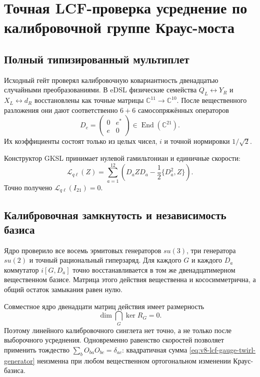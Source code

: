 \chapter{Точная LCF-проверка усреднение по калибровочной группе Краус-моста}
\label{ch:v8-gauge-twirl-kraus-lcf-migration-gate}

\section{Полный типизированный мультиплет}

Исходный гейт проверял калибровочную ковариантность двенадцатью случайными
преобразованиями. В eDSL физические семейства
$Q_L\leftrightarrow Y_R$ и $X_L\leftrightarrow d_R$ восстановлены как
точные матрицы $\mathbb C^{11}\to\mathbb C^{10}$. После вещественного
разложения они дают соответственно $6+6$ самосопряжённых операторов
\begin{equation}
 D_e=\begin{pmatrix}0&e^*\\e&0\end{pmatrix}
 \in\operatorname{End}(\mathbb C^{21}).
\end{equation}
Их коэффициенты состоят только из целых чисел, $i$ и точной нормировки
$1/\sqrt2$.

Конструктор GKSL принимает нулевой гамильтониан и единичные скорости:
\begin{equation}
 \mathcal L_{q\ell}(Z)
 =\sum_{a=1}^{12}\left(D_aZD_a-\frac12\{D_a^2,Z\}\right).
 \label{eq:v8-lcf-gauge-twirl-generator}
\end{equation}
Точно получено $\mathcal L_{q\ell}(I_{21})=0$.

\section{Калибровочная замкнутость и независимость базиса}

Ядро проверило все восемь эрмитовых генераторов $su(3)$, три генератора
$su(2)$ и точный рациональный гиперзаряд. Для каждого $G$ и каждого $D_a$
коммутатор $i[G,D_a]$ точно восстанавливается в том же двенадцатимерном
вещественном базисе. Матрица этого действия вещественна и кососимметрична,
а общий остаток замыкания равен нулю.

Совместное ядро двенадцати матриц действия имеет размерность
\begin{equation}
 \dim\bigcap_G\ker R_G=0.
 \label{eq:v8-lcf-no-linear-gauge-singlet}
\end{equation}
Поэтому линейного калибровочного синглета нет точно, а не только после выборочного
усреднения. Одновременно равенство скоростей позволяет применить тождество
$\sum_bO_{ba}O_{bc}=\delta_{ac}$: квадратичная сумма
\eqref{eq:v8-lcf-gauge-twirl-generator} неизменна при любом вещественном
ортогональном изменении Краус-базиса.

